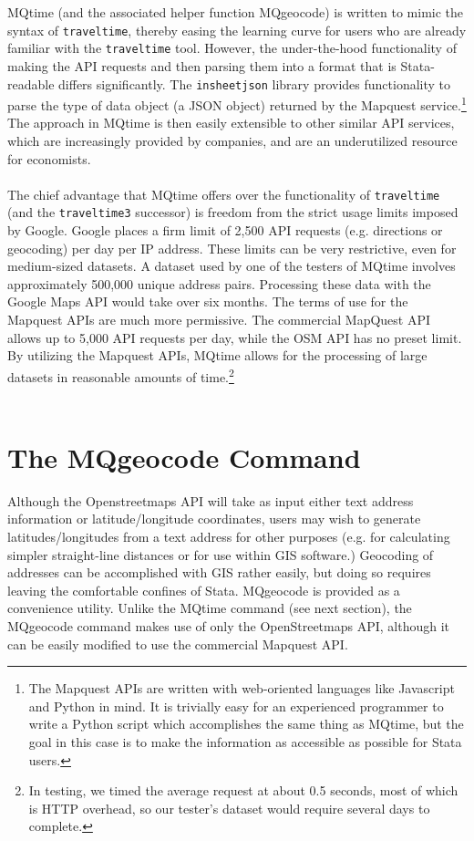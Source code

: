 \documentclass[12pt]{article}
\begin{document}
MQtime (and the associated helper function MQgeocode) is written to mimic the syntax of \verb|traveltime|, thereby easing the learning curve for users who are already familiar with the \verb|traveltime| tool. However, the under-the-hood functionality of making the API requests and then parsing them into a format that is Stata-readable differs significantly. The \verb|insheetjson| library provides functionality to parse the type of data object (a JSON object) returned by the Mapquest service.\footnote{The Mapquest APIs are written with web-oriented languages like Javascript and Python in mind. It is trivially easy for an experienced programmer to write a Python script which accomplishes the same thing as MQtime, but the goal in this case is to make the information as accessible as possible for Stata users.} The approach in MQtime is then easily extensible to other similar API services, which are increasingly provided by companies, and are an underutilized resource for economists. 
\\ \\
The chief advantage that MQtime offers over the functionality of \verb|traveltime| (and the \verb|traveltime3| successor) is freedom from the strict usage limits imposed by Google. Google places a firm limit of 2,500 API requests (e.g. directions or geocoding) per day per IP address. These limits can be very restrictive, even for medium-sized datasets. A dataset used by one of the testers of MQtime involves approximately 500,000 unique address pairs. Processing these data with the Google Maps API would take over six months. The terms of use for the Mapquest APIs are much more permissive. The commercial MapQuest API allows up to 5,000 API requests per day, while the OSM API has no preset limit. By utilizing the Mapquest APIs, MQtime allows for the processing of large datasets in reasonable amounts of time.\footnote{In testing, we timed the average request at about 0.5 seconds, most of which is HTTP overhead, so our tester's dataset would require several days to complete.} 
\\ \\
\section{The MQgeocode Command}
Although the Openstreetmaps API will take as input either text address information or latitude/longitude coordinates, users may wish to generate latitudes/longitudes from a text address for other purposes (e.g. for calculating simpler straight-line distances or for use within GIS software.) Geocoding of addresses can be accomplished with GIS rather easily, but doing so requires leaving the comfortable confines of Stata. MQgeocode is provided as a convenience utility. Unlike the MQtime command (see next section), the MQgeocode command makes use of only the OpenStreetmaps API, although it can be easily modified to use the commercial Mapquest API.
\end{document}

